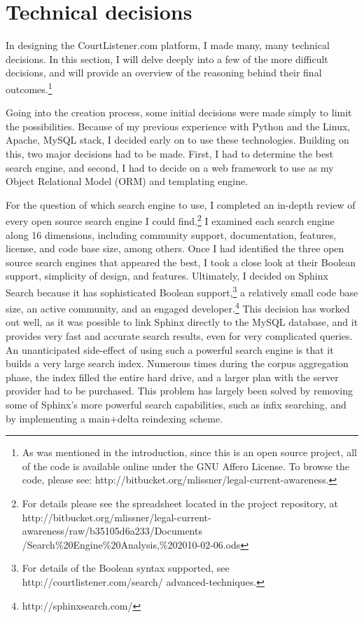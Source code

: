 \label{techdecisions}
\section{Technical decisions}
In designing the CourtListener.com platform, I made many, many technical decisions. In this section, I will delve deeply into a few of the more difficult decisions, and will provide an overview of the reasoning behind their final outcomes.\footnote{As was mentioned in the introduction, since this is an open source project, all of the code is available online under the GNU Affero License. To browse the code, please see: http://bitbucket.org/mlissner/legal-current-awareness.}

Going into the creation process, some initial decisions were made simply to limit the possibilities. Because of my previous experience with Python and the Linux, Apache, MySQL stack, I decided early on to use these technologies. Building on this, two major decisions had to be made. First, I had to determine the best search engine, and second, I had to decide on a web framework to use as my Object Relational Model (ORM) and templating engine. 

For the question of which search engine to use, I completed an in-depth review of every open source search engine I could find.\footnote{For details please see the spreadsheet located in the project repository, at http://bitbucket.org/mlissner/legal-current-awareness/raw/b35105d6a233/Documents /Search\%20Engine\%20Analysis,\%202010-02-06.ods} I examined each search engine along 16 dimensions, including community support, documentation, features, license, and code base size, among others. Once I had identified the three open source search engines that appeared the best, I took a close look at their Boolean support, simplicity of design, and features. Ultimately, I decided on Sphinx Search because it has sophisticated Boolean support,\footnote{For details of the Boolean syntax supported, see http://courtlistener.com/search/ advanced-techniques.} a relatively small code base size, an active community, and an engaged developer.\footnote{http://sphinxsearch.com/} This decision has worked out well, as it was possible to link Sphinx directly to the MySQL database, and it provides very fast and accurate search results, even for very complicated queries. An unanticipated side-effect of using such a powerful search engine is that it builds a very large search index. Numerous times during the corpus aggregation phase, the index filled the entire hard drive, and a larger plan with the server provider had to be purchased. This problem has largely been solved by removing some of Sphinx's more powerful search capabilities, such as infix searching, and by implementing a main+delta reindexing scheme. 

